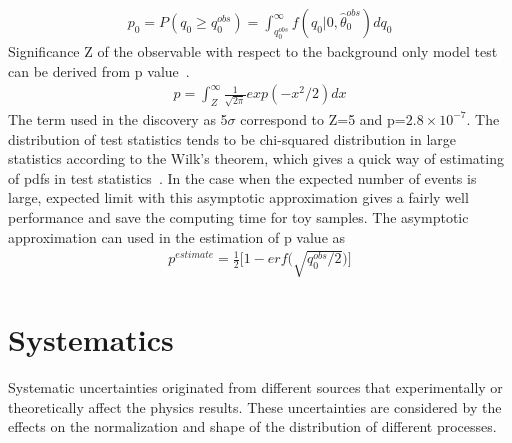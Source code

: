 \begin{align*}
p_{0}=P(q_{0}\geq q_{0}^{obs})=\int^{\infty}_{q_{0}^{obs}}f(q_{0}|0,\hat{\theta}_{0}^{obs})d q_{0}
\end{align*}  
Significance Z of the observable with respect to the background only model test can be derived from p value~\cite{CMS-NOTE-2011-005}.
\begin{align*}
p=\int^{\infty}_{Z}\frac{1}{\sqrt{2\pi}}exp(-x^2/2)dx
\end{align*}  
The term used in the discovery as 5$\sigma$ correspond to Z=5 and p=$2.8\times10^{-7}$. The distribution of test statistics tends to be chi-squared distribution in large statistics according to the Wilk's theorem, which gives a quick way of estimating of pdfs in test statistics~\cite{LHCstaticstics}. In the case when the expected number of events is large, expected limit with this asymptotic approximation gives a fairly well performance and save the computing time for toy samples. The asymptotic approximation can used in the estimation of p value as
\begin{align*}
p^{estimate}=\frac{1}{2}\bigg[1-erf\bigg(\sqrt{q_{0}^{obs}/2}\bigg)\bigg]
\end{align*}  



\section{Systematics}
Systematic uncertainties originated from different sources that experimentally or theoretically affect the physics results. These uncertainties are considered by the effects on the normalization and shape of the distribution of different processes. 

